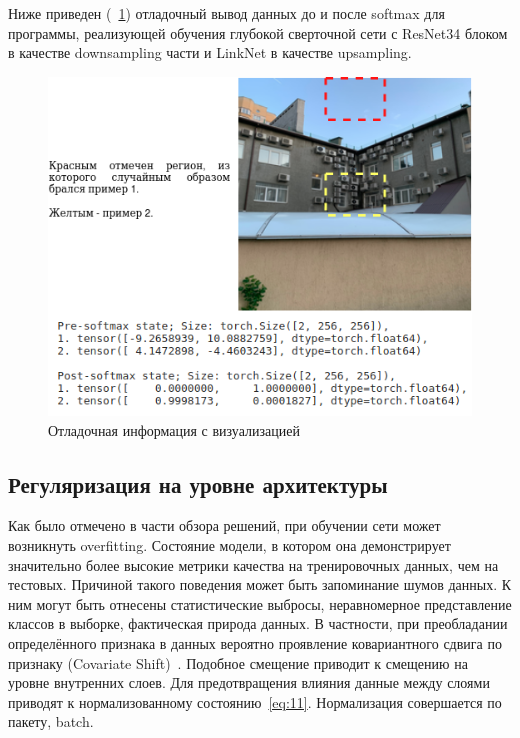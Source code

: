 Ниже приведен (~\ref{fig:softmax_debug_info}) отладочный вывод данных до и после softmax для программы, реализующей обучения глубокой сверточной сети с ResNet34 блоком в качестве downsampling части
и LinkNet в качестве upsampling.

\begin{figure}[H]
    \centering
    \includegraphics[width=\textwidth]{img/softmax_debug_info.png}
    \caption{Отладочная информация с визуализацией}
    \label{fig:softmax_debug_info}
\end{figure}

\subsection{Регуляризация на уровне архитектуры}

Как было отмечено в части обзора решений, при обучении сети может возникнуть overfitting.
Состояние модели, в котором она демонстрирует значительно более высокие метрики качества на тренировочных данных,
чем на тестовых.
Причиной такого поведения может быть запоминание шумов данных.
К ним могут быть отнесены статистические выбросы, неравномерное представление классов в выборке, фактическая природа данных.
В частности, при преобладании определённого признака в данных вероятно проявление ковариантного сдвига по признаку (Covariate Shift)~\autocite{covariateShift}.
Подобное смещение приводит к смещению на уровне внутренних слоев.
Для предотвращения влияния данные между слоями приводят к нормализованному состоянию~\eqref{eq:11}.
Нормализация совершается по пакету, batch.

